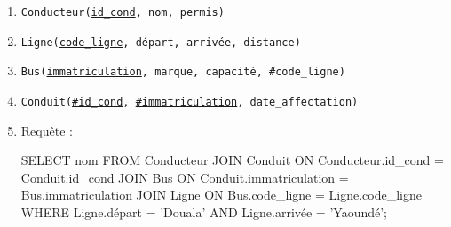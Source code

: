 \begin{enumerate}
    \item \texttt{Conducteur(\underline{id\_cond}, nom, permis)}
    \item \texttt{Ligne(\underline{code\_ligne}, départ, arrivée, distance)}
    \item \texttt{Bus(\underline{immatriculation}, marque, capacité, \#code\_ligne)}
    \item \texttt{Conduit(\underline{\#id\_cond}, \underline{\#immatriculation}, date\_affectation)}
    \item Requête :
    \begin{sqlcode}
SELECT nom FROM Conducteur
JOIN Conduit ON Conducteur.id_cond = Conduit.id_cond
JOIN Bus ON Conduit.immatriculation = Bus.immatriculation
JOIN Ligne ON Bus.code_ligne = Ligne.code_ligne
WHERE Ligne.départ = 'Douala' AND Ligne.arrivée = 'Yaoundé';
    \end{sqlcode}
\end{enumerate}